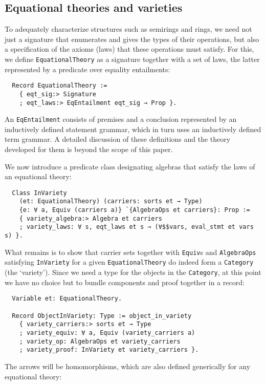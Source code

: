\documentclass[a4paper,10pt,runningheads]{llncs}
\begin{document}
\subsection{Equational theories and varieties}
\label{varieties}

To adequately characterize structures such as semirings and rings, we need not just a signature that enumerates and gives the types of their operations, but also a specification of the axioms (laws) that these operations must satisfy. For this, we define \lstinline|EquationalTheory| as a signature together with a set of laws, the latter represented by a predicate over equality entailments:
\begin{lstlisting}
  Record EquationalTheory :=
    { eqt_sig:> Signature
    ; eqt_laws:> EqEntailment eqt_sig → Prop }.
\end{lstlisting}
An \lstinline|EqEntailment| consists of premises and a conclusion represented by an inductively defined statement grammar, which in turn uses an inductively defined term grammar. A detailed discussion of these definitions and the theory developed for them is beyond the scope of this paper.

We now introduce a predicate class designating algebras that satisfy the laws of an equational theory:
\begin{lstlisting}
  Class InVariety
    (et: EquationalTheory) (carriers: sorts et → Type)
    {e: ∀ a, Equiv (carriers a)} `{AlgebraOps et carriers}: Prop :=
    { variety_algebra:> Algebra et carriers
    ; variety_laws: ∀ s, eqt_laws et s → (∀$$vars, eval_stmt et vars s) }.
\end{lstlisting}

What remains is to show that carrier sets together with \lstinline|Equiv|s and \lstinline|AlgebraOps| satisfying \lstinline|InVariety| for a given \lstinline|EquationalTheory| do indeed form a \lstinline|Category| (the `variety'). Since we need a type for the objects in the \lstinline|Category|, at this point we have no choice but to bundle components and proof together in a record:
\begin{lstlisting}
  Variable et: EquationalTheory.

  Record ObjectInVariety: Type := object_in_variety
    { variety_carriers:> sorts et → Type
    ; variety_equiv: ∀ a, Equiv (variety_carriers a)
    ; variety_op: AlgebraOps et variety_carriers
    ; variety_proof: InVariety et variety_carriers }.
\end{lstlisting}
The arrows will be homomorphisms, which are also defined generically for any equational theory:
\end{document}
